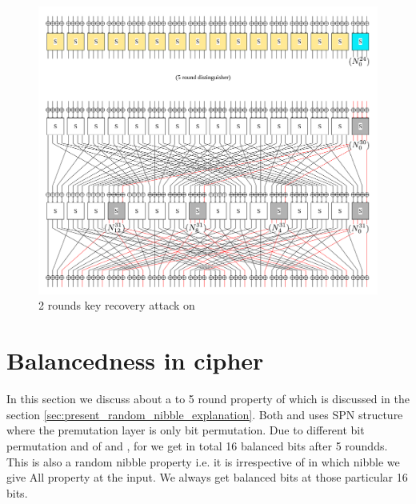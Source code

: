 \begin{figure}[!h]
	\centering
	\includegraphics[width=\linewidth]{fig/spn_code_libra_2_round_attack.pdf}
	\caption{2 rounds key recovery attack on \present}
	\label{fig:key_recovery_2_round_present}
\end{figure}




\section{Balancedness in \gift cipher}	\label{sec:gift_random_nibble_explanation}
In this section we discuss about a to 5 round property of \present which is discussed in the section \autoref{sec:present_random_nibble_explanation}. Both \present and \gift uses SPN structure where the premutation layer is only bit permutation. Due to different bit permutation and \sbb of \present and \gift, for  we get in total 16 balanced bits after 5 roundds. This is also a random nibble property i.e. it is irrespective of in which nibble we give All property at the input. We always get balanced bits at those particular 16 bits.


